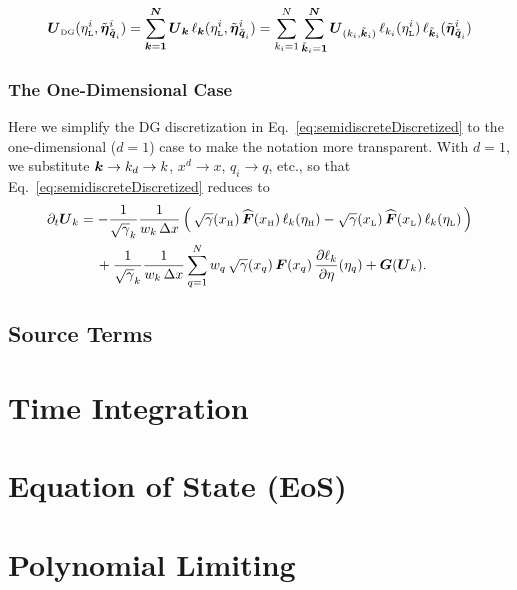 \documentclass[10pt,preprint]{aastex}
\begin{document}
\begin{equation}
  \boldsymbol{U}_{\mbox{\tiny DG}}(\eta_{\mbox{\tiny L}}^{i},\tilde{\boldsymbol{\eta}}_{\tilde{\boldsymbol{q}}_{i}}^{i})
  =\sum_{\boldsymbol{k}=\boldsymbol{1}}^{\boldsymbol{N}}\boldsymbol{U}_{\boldsymbol{k}}\,\ell_{\boldsymbol{k}}(\eta_{\mbox{\tiny L}}^{i},\tilde{\boldsymbol{\eta}}_{\tilde{\boldsymbol{q}}_{i}}^{i})
  =\sum_{k_{i}=1}^{N}\sum_{\tilde{\boldsymbol{k}}_{i}=\boldsymbol{1}}^{\boldsymbol{N}}\boldsymbol{U}_{(k_{i},\tilde{\boldsymbol{k}}_{i})}\,\ell_{k_{i}}(\eta_{\mbox{\tiny L}}^{i})\,\ell_{\tilde{\boldsymbol{k}}_{i}}(\tilde{\boldsymbol{\eta}}_{\tilde{\boldsymbol{q}}_{i}}^{i})
\end{equation}

\subsubsection{The One-Dimensional Case}

Here we simplify the DG discretization in Eq.~\eqref{eq:semidiscreteDiscretized} to the one-dimensional ($d=1$) case to make the notation more transparent.  
With $d=1$, we substitute $\boldsymbol{k}\to k_{d}\to k$, $x^{d}\to x$, $q_{i}\to q$, etc., so that Eq.~\eqref{eq:semidiscreteDiscretized} reduces to
\begin{align}
  \partial_{t}{}\boldsymbol{U}_{k}
  &=-\frac{1}{\sqrt{\gamma}_{k}}
  \frac{1}{w_{k}\,\Delta x}\,
  \Big(\,
    \sqrt{\gamma}(x_{\mbox{\tiny H}})\,\widehat{\boldsymbol{F}}(x_{\mbox{\tiny H}})\,\ell_{k}(\eta_{\mbox{\tiny H}})
    -\sqrt{\gamma}(x_{\mbox{\tiny L}})\,\widehat{\boldsymbol{F}}(x_{\mbox{\tiny L}})\,\ell_{k}(\eta_{\mbox{\tiny L}})
  \,\Big) \nonumber \\
  & \hspace{12pt}
  +\frac{1}{\sqrt{\gamma}_{k}}
  \frac{1}{w_{k}\,\Delta x}\sum_{q=1}^{N}w_{q}\,\sqrt{\gamma}(x_{q})\,\boldsymbol{F}(x_{q})\,\frac{\partial \ell_{k}}{\partial \eta}(\eta_{q})
  +\boldsymbol{G}(\boldsymbol{U}_{k}).
  \label{eq:semidiscreteDiscretized1D}
\end{align}

\subsection{Source Terms}
\label{sec:sourceTerms}

\section{Time Integration}

\section{Equation of State (EoS)}

\section{Polynomial Limiting}
\end{document}
